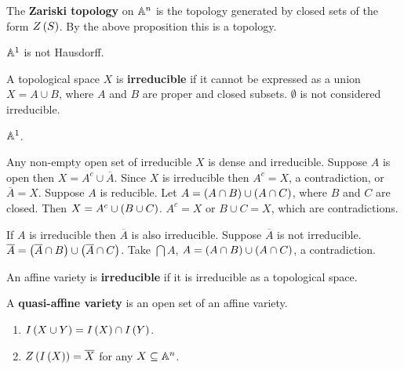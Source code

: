 \begin{definition}
The \textbf{Zariski topology} on $ \mathbb{A}^n $ is the topology generated by closed sets of the form $ Z\left( S \right) $. By the above proposition this is a topology.
\end{definition}

\begin{example}
$ \mathbb{A}^1 $ is not Hausdorff.
\end{example}

\begin{definition}
A topological space $ X $ is \textbf{irreducible} if it cannot be expressed as a union $ X = A \cup B $, where $ A $ and $ B $ are proper and closed subsets. $ \emptyset $ is not considered irreducible.
\end{definition}

\begin{example}
$ \mathbb{A}^1 $.
\end{example}

\begin{example}
Any non-empty open set of irreducible $ X $ is dense and irreducible. Suppose $ A $ is open then $ X = A^c \cup \overline{A} $. Since $ X $ is irreducible then $ A^c = X $, a contradiction, or $ \overline{A} = X $. Suppose $ A $ is reducible. Let $ A = \left( A \cap B \right) \cup \left( A \cap C \right) $, where $ B $ and $ C $ are closed. Then $ X = A^c \cup \left( B \cup C \right) $. $ A^c = X $ or $ B \cup C = X $, which are contradictions.
\end{example}

\begin{example}
If $ A $ is irreducible then $ \overline{A} $ is also irreducible. Suppose $ \overline{A} $ is not irreducible. $ \overline{A} = \left( \overline{A} \cap B \right) \cup \left( \overline{A} \cap C \right) $. Take $ \bigcap A $, $ A = \left( A \cap B \right) \cup \left( A \cap C \right) $, a contradiction.
\end{example}

\begin{definition}
An affine variety is \textbf{irreducible} if it is irreducible as a topological space.
\end{definition}

\begin{remark}
A \textbf{quasi-affine variety} is an open set of an affine variety.
\end{remark}

\pagebreak

\begin{proposition}
\hfill
\begin{enumerate}
\item $ I\left( X \cup Y \right) = I\left( X \right) \cap I\left( Y \right) $.
\item $ Z\left( I\left( X \right) \right) = \overline{X} $ for any $ X \subseteq \mathbb{A}^n $.
\end{enumerate}
\end{proposition}

